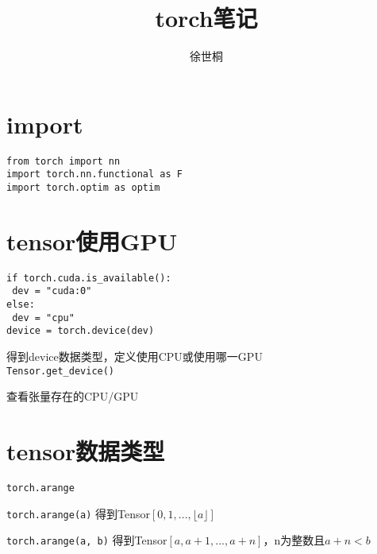 \documentclass[UTF8]{ctexart}
\title{torch笔记}
\author{徐世桐}
\date{}
\begin{document}
\maketitle

\section{import}
\noindent \texttt{from torch import nn}\\
\texttt{import torch.nn.functional as F}\\
\texttt{import torch.optim as optim}

\section{tensor使用GPU}
\noindent \texttt{}
\texttt{if torch.cuda.is\_available():}\\
\texttt{  dev = "cuda:0"}\\
\texttt{else:}\\
\texttt{  dev = "cpu"}\\
\texttt{device = torch.device(dev)}

  得到device数据类型，定义使用CPU或使用哪一GPU\\
\texttt{Tensor.get\_device()}

  查看张量存在的CPU/GPU



\section{tensor数据类型}
\noindent \texttt{torch.arange}

  \texttt{torch.arange(a)} 得到Tensor$[0, 1, ..., \lfloor a \rfloor]$

  \texttt{torch.arange(a, b)} 得到Tensor$[a, a+1, ..., a+n]$，n为整数且$a+n < b$
\end{document}
